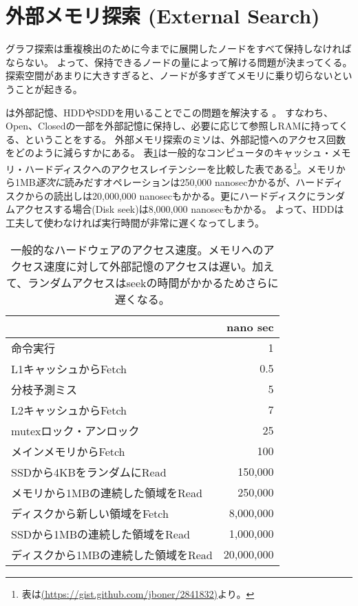\section{外部メモリ探索 (External Search)}
\label{sec:external-search}


グラフ探索は重複検出のために今までに展開したノードをすべて保持しなければならない。
よって、保持できるノードの量によって解ける問題が決まってくる。
探索空間があまりに大きすぎると、ノードが多すぎてメモリに乗り切らないということが起きる。

は外部記憶、HDDやSDDを用いることでこの問題を解決する \cite{chiang1995external}。
すなわち、Open、Closedの一部を外部記憶に保持し、必要に応じて参照しRAMに持ってくる、ということをする。
外部メモリ探索のミソは、外部記憶へのアクセス回数をどのように減らすかにある。
表\ref{tbl:latency}は一般的なコンピュータのキャッシュ・メモリ・ハードディスクへのアクセスレイテンシーを比較した表である\footnote{表は\url{(https://gist.github.com/jboner/2841832)}より。}。メモリから1MB{\it 逐次に}読みだすオペレーションは250,000 nanosecかかるが、ハードディスクからの読出しは20,000,000 nanosecもかかる。更にハードディスクにランダムアクセスする場合(Disk seek)は8,000,000 nanosecもかかる。
よって、HDDは工夫して使わなければ実行時間が非常に遅くなってしまう。%


\begin{table}
\centering
\caption{一般的なハードウェアのアクセス速度。メモリへのアクセス速度に対して外部記憶のアクセスは遅い。加えて、ランダムアクセスはseekの時間がかかるためさらに遅くなる。 }
\label{tbl:latency}
\begin{tabular}{|l|r|}
		   & nano sec \\ \hline
	命令実行 & 1 \\
	L1キャッシュからFetch & 0.5 \\
	分枝予測ミス 		& 5 \\
	L2キャッシュからFetch & 7 \\
	mutexロック・アンロック			& 25 \\
	メインメモリからFetch  	& 100 \\
	SSDから4KBをランダムにRead         & 150,000 \\
	メモリから1MBの連続した領域をRead & 250,000 \\
	ディスクから新しい領域をFetch & 8,000,000 \\
	SSDから1MBの連続した領域をRead		& 1,000,000 \\
	ディスクから1MBの連続した領域をRead 	& 20,000,000 \\
	
\end{tabular}
\end{table}



